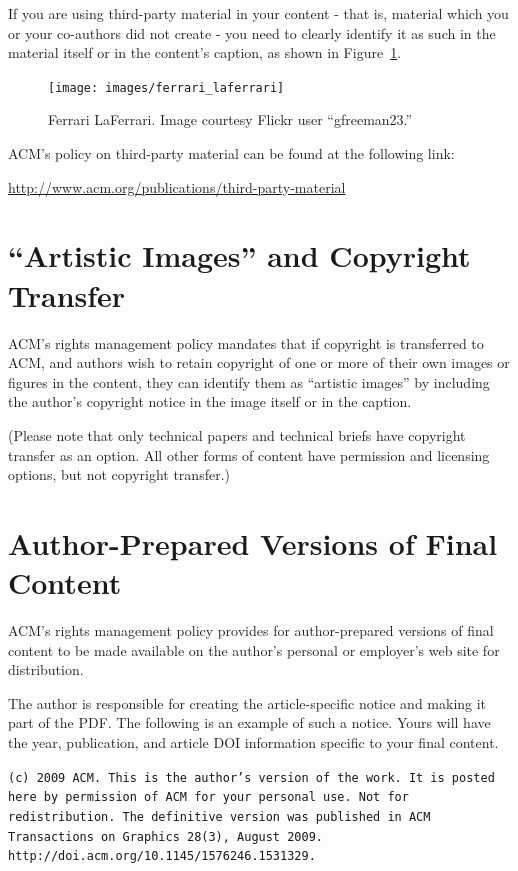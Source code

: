 \documentclass[tog]{acmsiggraph}
\begin{document}
If you are using third-party material in your content - that is,
material which you or your co-authors did not create - you need to
clearly identify it as such in the material itself or in the 
content's caption, as shown in Figure~\ref{fig:ferrari}.

\begin{figure}[ht]
  \centering
  \texttt{[image: images/ferrari\_laferrari]}
  \caption{Ferrari LaFerrari. Image courtesy Flickr user ``gfreeman23.''}
  \label{fig:ferrari}
\end{figure}

ACM's policy on third-party material can be found at the following link:

{\small\url{http://www.acm.org/publications/third-party-material}}

\section{``Artistic Images'' and Copyright Transfer}

ACM's rights management policy mandates that if copyright is
transferred to ACM, and authors wish to retain copyright of one or
more of their own images or figures in the content, they can identify
them as ``artistic images'' by including the author's copyright notice
in the image itself or in the caption.

(Please note that only technical papers and technical briefs have
copyright transfer as an option. All other forms of content have
permission and licensing options, but not copyright transfer.)

\section{Author-Prepared Versions of Final Content}

ACM's rights management policy provides for author-prepared versions
of final content to be made available on the author's personal or
employer's web site for distribution.

The author is responsible for creating the article-specific notice and
making it part of the PDF. The following is an example of such a
notice. Yours will have the year, publication, and article DOI
information specific to your final content.

\texttt{\small(c) 2009 ACM. This is the author's version of the work. It is posted here by permission of ACM for your personal use. Not for redistribution. The definitive version was published in ACM Transactions on Graphics 28(3), August 2009. http://doi.acm.org/10.1145/1576246.1531329.}
\end{document}
